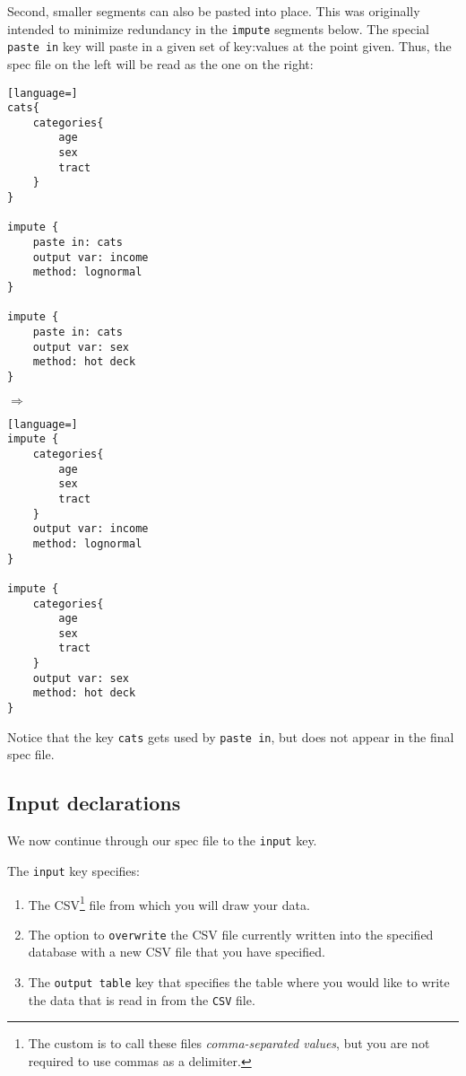 \documentclass{article}
\begin{document}
Second, smaller segments can also be pasted into place. This was originally intended to
minimize redundancy in the {\tt impute} segments below. The special {\tt paste in} key
will paste in a given set of key:values at the point given. Thus, the spec file on the
left will be read as the one on the right:

\begin{minipage}{0.45\linewidth}
\begin{lstlisting}[language=]
cats{
    categories{
        age
        sex
        tract
    }
}

impute {
    paste in: cats
    output var: income
    method: lognormal
}

impute {
    paste in: cats
    output var: sex
    method: hot deck
}
\end{lstlisting}


\end{minipage}
{\Large $\Rightarrow$}\hspace{1cm}
\begin{minipage}{0.45\linewidth}

\begin{lstlisting}[language=]
impute {
    categories{
        age
        sex
        tract
    }
    output var: income
    method: lognormal
}

impute {
    categories{
        age
        sex
        tract
    }
    output var: sex
    method: hot deck
}
\end{lstlisting}
\end{minipage}

Notice that the key {\tt cats} gets used by {\tt paste in}, but does not appear in
the final spec file.


\subsection{Input declarations}
We now continue through our spec file to the {\tt input} key.

The {\tt input} key specifies:
\begin{enumerate}
\item The  CSV\footnote{The custom is to call these files {\em
    comma-separated values}, but you are not required to use commas as a delimiter.}
    file from which you will draw your data.
\item The option to \texttt{overwrite} the CSV file currently written into the specified database with 
a new CSV file that you have specified.
\item The {\tt output table} key that specifies the table where you would like to 
write the data that is read in from the {\tt CSV} file.
\end{enumerate}
\end{document}
